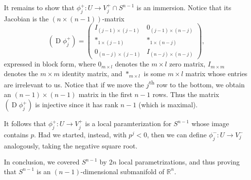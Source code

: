 \documentclass[notoc,notitlepage]{tufte-book}
\DeclareMathOperator{\D}{D}
\begin{document}
\begin{eg}
  It remains to show that $\phi_j^+ : U \to V_j^+ \cap S^{n - 1}$ is an
  immersion. Notice that its Jacobian is the $(n \times (n - 1))$-matrix
  \begin{equation*}
    (\D \phi_j^+) = \begin{pmatrix}
      I_{(j - 1) \times (j - 1)} & 0_{(j - 1) \times (n - j)} \\
      *_{1 \times (j - 1)}       & *_{1 \times (n - j)} \\
      0_{(n - j) \times (j - 1)} & I_{(n - j) \times (n - j)}
    \end{pmatrix},
  \end{equation*}
  expressed in block form, where $0_{m \times l}$ denotes the $m \times l$ zero
  matrix, $I_{m \times m}$ denotes the $m \times m$ identity matrix, and $*_{m
  \times l}$ is some $m \times l$ matrix whose entries are irrelevant to us.
  Notice that if we move the $j$\textsuperscript{th} row to the bottom, we
  obtain an $(n - 1) \times (n - 1)$ matrix in the first $n - 1$ rows. Thus the
  matrix $(\D \phi_j^+)$ is injective since it has rank $n - 1$ (which is
  maximal).

  It follows that $\phi_j^+ : U \to V_j^+$ is a local paramterization for $S^{n
  - 1}$ whose image contains $p$. Had we started, instead, with $p^j < 0$, then
  we can define $\phi_j^- : U \to V_j^-$ analogously, taking the negative square
  root.

  In conclusion, we covered $S^{n - 1}$ by $2n$ local parametrizations, and thus
  proving that $S^{n - 1}$ is an $( n - 1 )$-dimensional submanifold of
  $\mathbb{R}^n$.
\end{eg}
\end{document}
